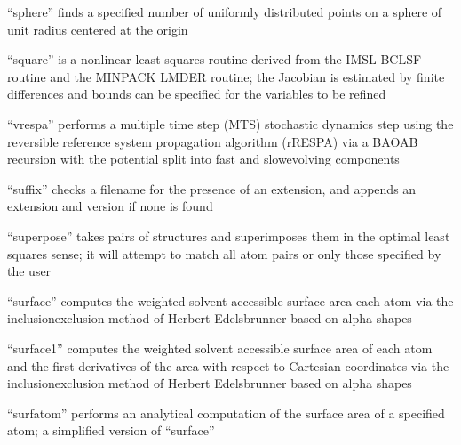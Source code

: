 \documentclass[letterpaper,11pt,english]{sphinxmanual}
\begin{document}
\sphinxAtStartPar
“sphere” finds a specified number of uniformly distributed points on a sphere of unit radius centered at the origin

\sphinxAtStartPar
{}

\sphinxAtStartPar
“square” is a nonlinear least squares routine derived from the IMSL BCLSF routine and the MINPACK LMDER routine; the Jacobian is estimated by finite differences and bounds can be specified for the variables to be refined

\sphinxAtStartPar
{}

\sphinxAtStartPar
“vrespa” performs a multiple time step (MTS) stochastic dynamics step using the reversible reference system propagation algorithm (r\sphinxhyphen{}RESPA) via a BAOAB recursion with the potential split into fast\sphinxhyphen{} and slow\sphinxhyphen{}evolving components

\sphinxAtStartPar
{}

\sphinxAtStartPar
“suffix” checks a filename for the presence of an extension, and appends an extension and version if none is found

\sphinxAtStartPar
{}

\sphinxAtStartPar
“superpose” takes pairs of structures and superimposes them in the optimal least squares sense; it will attempt to match all atom pairs or only those specified by the user

\sphinxAtStartPar
{}

\sphinxAtStartPar
“surface” computes the weighted solvent accessible surface area each atom via the inclusion\sphinxhyphen{}exclusion method of Herbert Edelsbrunner based on alpha shapes

\sphinxAtStartPar
{}

\sphinxAtStartPar
“surface1” computes the weighted solvent accessible surface area of each atom and the first derivatives of the area with respect to Cartesian coordinates via the inclusion\sphinxhyphen{}exclusion method of Herbert Edelsbrunner based on alpha shapes

\sphinxAtStartPar
{}

\sphinxAtStartPar
“surfatom” performs an analytical computation of the surface area of a specified atom; a simplified version of “surface”

\sphinxAtStartPar
{}
\end{document}
